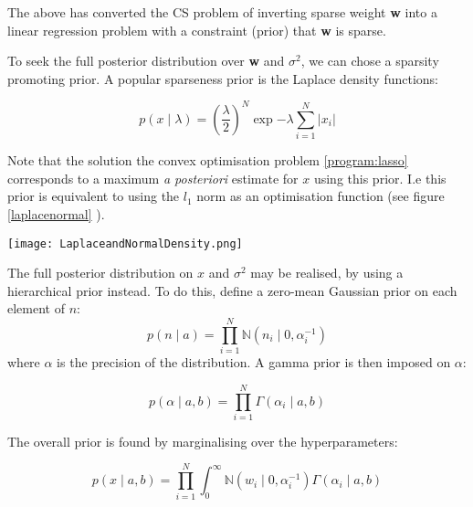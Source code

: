 The above has converted the CS problem of inverting sparse weight \textbf{w} into a linear regression problem with a constraint (prior) that \textbf{w} is sparse. 

To seek the full posterior distribution over \textbf{w} and \( \sigma^2 \), we can chose a sparsity promoting prior. A popular sparseness prior is the Laplace density functions:

\begin{equation}
p\left(x\mid\lambda\right) = \left(\frac{\lambda}{2}\right)^N \exp{-\lambda \sum_{i=1}^{N} |x_i|}
\end{equation}

Note that the solution the convex optimisation problem \eqref{program:lasso} corresponds to a maximum \textit{a posteriori} estimate for \(x\) using this prior. I.e this prior is equivalent to using the \(l_1\) norm as an optimisation function (see figure \ref{laplacenormal} \cite{Tibshirani1996}).

\begin{figure*}[h]
\centering
\texttt{[image: LaplaceandNormalDensity.png]}
\caption{The Laplace (\(l_1\)-norm, bold line) and Normal (\(l_2\)-norm, dotted line) densities. Note that the Laplace density is sparsity promoting as it penalises solutions away from zero more than the Gaussian density. \cite{Tibshirani1996}}
\label{laplacenormal}
\end{figure*}

The full posterior distribution on \(x\) and \(\sigma^2\) may be realised, by using a hierarchical prior instead. To do this, define a zero-mean Gaussian prior on each element of \(n\):
%
\begin{equation}
p\left(n\mid a\right) = \prod_{i=1}^{N}\mathbb{N}\left(n_i\mid 0, \alpha_{i}^{-1}\right)
\end{equation}
%
where \(\alpha\) is the precision of the distribution. A gamma prior is then imposed on \(\alpha\):

\begin{equation}
p\left(\alpha \mid a, b \right) = \prod_{i=1}^{N} \Gamma\left( \alpha_i \mid a, b \right)
\end{equation}

The overall prior is found by marginalising over the hyperparameters:

\begin{equation}
p\left( x \mid a, b \right) = \prod_{i=1}^{N} \int_{0}^{\infty} \mathbb{N}\left(w_i\mid 0, \alpha_{i}^{-1}\right) \Gamma\left( \alpha_i \mid a, b \right)
\end{equation}

